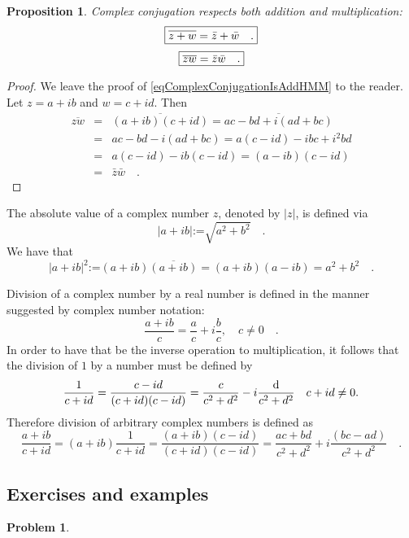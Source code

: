 \documentclass[12pt]{book}
\newcommand{\eqdef}{\textbf{:=}}
\newtheorem{problem}[theorem]{Problem}
\newtheorem{prop}[theorem]{Proposition}
\begin{document}
\begin{prop}
Complex conjugation respects both addition and multiplication:
\begin{equation} \boxed{
\label{eqComplexConjugationIsAddHMM}
\overline {z +w}= \bar z +\bar w\quad .
}
\end{equation}
\begin{equation}\boxed{
\label{eqComplexConjugationIsFieldHMM}  \overline {z w}= \bar z \bar w\quad .
}
\end{equation}

\end{prop}
\begin{proof}
We leave the proof of \eqref{eqComplexConjugationIsAddHMM} to the reader. Let $z= a+ib$ and $w=c+id$. Then
\begin{equation*}
\begin{array}{rcl}\overline {zw}&=& \overline{(a+ib)(c+id)}= \overline{ac-bd +i(ad+bc) }\\&=& ac-bd-i(ad+bc)= a(c-id)-ibc+i^{2}bd\\&=& a(c-id)-ib(c-id)= (a-ib)(c-id)\\&=&\bar z \bar w\quad .
\end{array}
\end{equation*}
\end{proof}
  The absolute value of a complex number $z$, denoted by $|z|$, is defined via
\[
|a+ib|\eqdef \sqrt{a^2+b^2}\quad .
\]
We have that
\[
|a+ib|^2\eqdef (a+ib)\overline{(a+ib)}=(a+ib)(a-ib)=a^2+b^2 \quad .
\]

Division of a complex number by a real number is defined in the manner suggested by complex number notation:
\[
\frac{a+ib}{c}= \frac{a}{c}+i\frac{b}{c}, \quad c\neq 0\quad .
\]
In order to have that be the inverse operation to multiplication, it follows that the division of $1$ by a number must be defined by
\[
\frac{1}{c+id}= \frac{c-id}{(c+id)(c-id)}=\frac{c}{c^2+d^2}-i\frac{{\normalfont \text{d}}}{c^2+d^2}  \quad c+id\neq 0.
\]
Therefore division of arbitrary complex numbers is defined as
\[
\frac{a+ib}{c+id}=(a+ib)\frac{1}{c+id}= \frac{(a+ib)(c-id)}{(c+id)(c-id)}= \frac{ac+bd}{c^2+d^2}+i\frac{(bc-ad)}{c^2+d^2} \quad .
\]

\subsection{Exercises and examples}
\begin{problem}

\end{problem}

\end{document}
